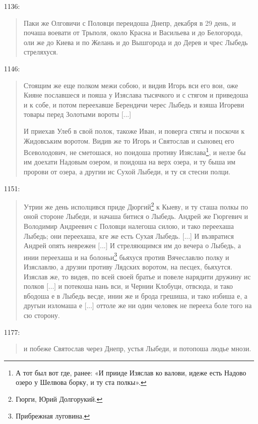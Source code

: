 1136:

\begin{quotation}
\noindent Паки же Олговичи с Половци переидоша Днепр, декабря в 29 день, и почаша воевати от Трьполя, около Красна и Васильева и до Белогорода, оли же до Киева и по Желань и до Вышгорода и до Дерев и чрес Лыбедь стреляхуся.
\end{quotation}

1146:

\begin{quotation}
\noindent Стоящим же еще полком межи собою, и видив Игорь вси его вои, оже Кияне пославшеся и пояша у Изяслава тысячкого и с стягом и приведоша и к собе, и потом переехавше Берендичи черес Лыбедь и взяша Игореви товары перед Золотыми вороты [...]

И приехав Улеб в свой полок, такоже Иван, и поверга стягы и поскочи к Жидовським воротом. Видив же то Игорь и Святослав и сыновец его Всеволодович, не сметошася, но поидоша противу Изяслава\footnote{А тот был вот где, ранее: «И прииде Изяслав ко валови, идеже есть Надово озеро у Шелвова борку, и ту ста полкы».}, и нелзе бы им доехати Надовым озером, и поидоша на верх озера, и ту быша им пророви от озера, а другии ис Сухой Лыбеди, и ту ся стесни полци.
\end{quotation} 

1151:

\begin{quotation}
\noindent Утрии же день исполцився приде Дюргий\footnote{Гюрги, Юрий Долгорукий.} к Кыеву, и ту сташа полкы по оной стороне Лыбеди, и начаша битися о Лыбедь. Андрей же Гюргевич и Володимир Андреевич с Половци налегоша силою, и тако переехаша Лыбедь; они переехаша, кге же есть Сухая Лыбедь. [...]
И възвратися Андрей опять неврежен [...] И стреляющимся им до вечера о Лыбедь, а инии переехаша и на болоньи\footnote{Прибрежная луговина.} бьяхуся против Вячеславлю полку и Изяславлю, а друзии противу Лядских воротом, на песцех, бьяхутся. Изяслав же, то видев, по всей своей братье и повеле нарядити дружину ис полков [...] и потекоша нань вси, и Чернии Клобуци, отвсюда, и тако вбодоша е в Лыбедь весде, инии же и брода грешиша, и тако избиша е, а другыи изломаша е [...] оттоле же ни один человек не перееха боле того на сю сторону.
\end{quotation}

1177:

\begin{quotation}
\noindent и побеже Святослав через Днепр, устья Лыбеди, и потопоша людье мнози.
\end{quotation}

